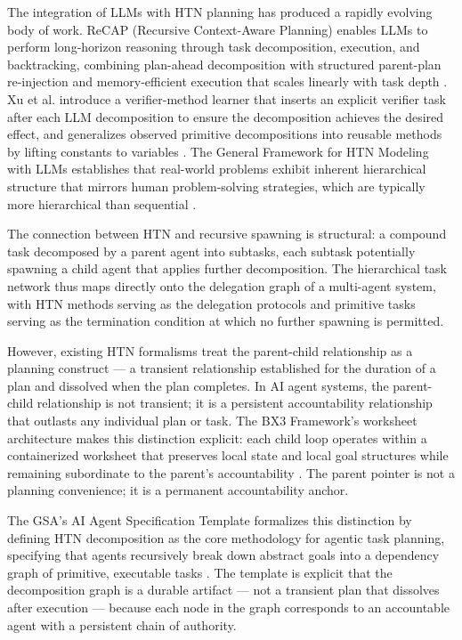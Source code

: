 The integration of LLMs with HTN planning has produced a rapidly evolving body of work. ReCAP (Recursive Context-Aware Planning) enables LLMs to perform long-horizon reasoning through task decomposition, execution, and backtracking, combining plan-ahead decomposition with structured parent-plan re-injection and memory-efficient execution that scales linearly with task depth \cite{recap2025}. Xu et al. introduce a verifier-method learner that inserts an explicit verifier task after each LLM decomposition to ensure the decomposition achieves the desired effect, and generalizes observed primitive decompositions into reusable methods by lifting constants to variables \cite{xu2025htn}. The General Framework for HTN Modeling with LLMs establishes that real-world problems exhibit inherent hierarchical structure that mirrors human problem-solving strategies, which are typically more hierarchical than sequential \cite{icaps25htn2025}.

The connection between HTN and recursive spawning is structural: a compound task decomposed by a parent agent into subtasks, each subtask potentially spawning a child agent that applies further decomposition. The hierarchical task network thus maps directly onto the delegation graph of a multi-agent system, with HTN methods serving as the delegation protocols and primitive tasks serving as the termination condition at which no further spawning is permitted.

However, existing HTN formalisms treat the parent-child relationship as a planning construct --- a transient relationship established for the duration of a plan and dissolved when the plan completes. In AI agent systems, the parent-child relationship is not transient; it is a persistent accountability relationship that outlasts any individual plan or task. The BX3 Framework's worksheet architecture makes this distinction explicit: each child loop operates within a containerized worksheet that preserves local state and local goal structures while remaining subordinate to the parent's accountability \cite{bx3whitepaper2026}. The parent pointer is not a planning convenience; it is a permanent accountability anchor.

The GSA's AI Agent Specification Template formalizes this distinction by defining HTN decomposition as the core methodology for agentic task planning, specifying that agents recursively break down abstract goals into a dependency graph of primitive, executable tasks \cite{gsadevcrew2025}. The template is explicit that the decomposition graph is a durable artifact --- not a transient plan that dissolves after execution --- because each node in the graph corresponds to an accountable agent with a persistent chain of authority.

